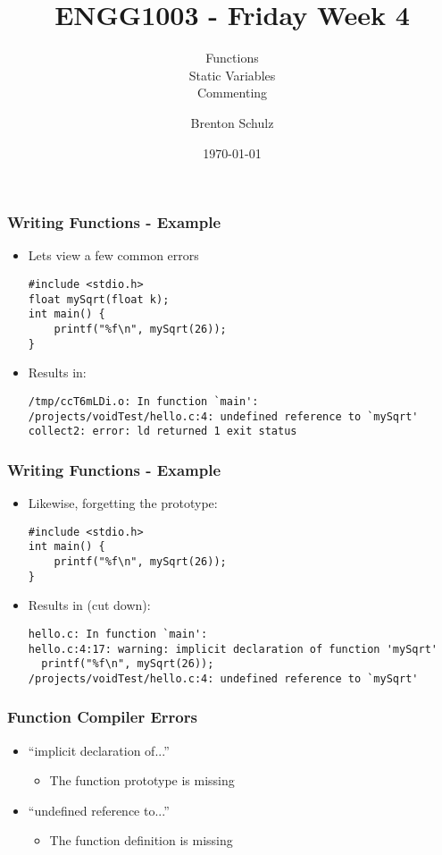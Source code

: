 \documentclass[14pt]{beamer}
\title{ENGG1003 - Friday Week 4}
\subtitle{Functions\\Static Variables\\Commenting}
\author{Brenton Schulz}
\institute{University of Newcastle}
\date{\today}
\begin{document}
\titlepage

\begin{frame}[fragile]
\frametitle{Writing Functions - Example}

\begin{itemize}
\item Lets view a few common errors
\begin{lstlisting}[style=CStyle]
#include <stdio.h>
float mySqrt(float k);
int main() {
	printf("%f\n", mySqrt(26));
}
\end{lstlisting}
\item Results in:
\begin{lstlisting}[style=pseudo]
/tmp/ccT6mLDi.o: In function `main':
/projects/voidTest/hello.c:4: undefined reference to `mySqrt'
collect2: error: ld returned 1 exit status
\end{lstlisting}
\end{itemize}
\end{frame}

\begin{frame}[fragile]
\frametitle{Writing Functions - Example}
\begin{itemize}
\item Likewise, forgetting the prototype:
\begin{lstlisting}[style=CStyle]
#include <stdio.h>
int main() {
	printf("%f\n", mySqrt(26));
}
\end{lstlisting}
\item Results in (cut down):
\begin{lstlisting}[style=pseudo]
hello.c: In function `main':
hello.c:4:17: warning: implicit declaration of function 'mySqrt'
  printf("%f\n", mySqrt(26));
/projects/voidTest/hello.c:4: undefined reference to `mySqrt'

\end{lstlisting}
\end{itemize}
\end{frame}

\begin{frame}
\frametitle{Function Compiler Errors}
\begin{itemize}
\item ``implicit declaration of...''
	\begin{itemize}
		\item The function prototype is missing
	\end{itemize}
\item ``undefined reference to...''
	\begin{itemize}
		\item The function definition is missing
	\end{itemize}
\end{itemize}
\end{frame}
\end{document}
